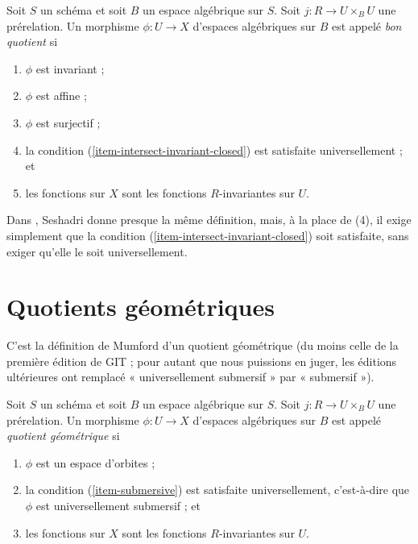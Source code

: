 \begin{definition}
\label{definition-good}
Soit $S$ un schéma et soit $B$ un espace algébrique sur $S$.
Soit $j : R \to U \times_B U$ une prérelation.
Un morphisme $\phi : U \to X$ d'espaces algébriques sur $B$
est appelé {\it bon quotient} si
\begin{enumerate}
\item $\phi$ est invariant ;
\item $\phi$ est affine ;
\item $\phi$ est surjectif ;
\item la condition (\ref{item-intersect-invariant-closed}) est satisfaite universellement ; et
\item les fonctions sur $X$ sont les fonctions $R$-invariantes sur $U$.
\end{enumerate}
\end{definition}

\noindent
Dans \cite{seshadri_quotients}, Seshadri donne presque la même définition,
mais, à la place de (4), il exige simplement que la condition
(\ref{item-intersect-invariant-closed}) soit satisfaite, sans exiger
qu'elle le soit universellement.








\section{Quotients géométriques}
\label{section-geometric}

\noindent
C'est la définition de Mumford d'un quotient géométrique (du moins celle
de la première édition de GIT ; pour autant que nous puissions en juger, les éditions ultérieures
ont remplacé « universellement submersif » par « submersif »).

\begin{definition}
\label{definition-geometric}
Soit $S$ un schéma et soit $B$ un espace algébrique sur $S$.
Soit $j : R \to U \times_B U$ une prérelation.
Un morphisme $\phi : U \to X$ d'espaces algébriques sur $B$
est appelé {\it quotient géométrique} si
\begin{enumerate}
\item $\phi$ est un espace d'orbites ;
\item la condition (\ref{item-submersive}) est satisfaite universellement, c'est-à-dire
que $\phi$ est universellement submersif ; et
\item les fonctions sur $X$ sont les fonctions $R$-invariantes sur $U$.
\end{enumerate}
\end{definition}

















